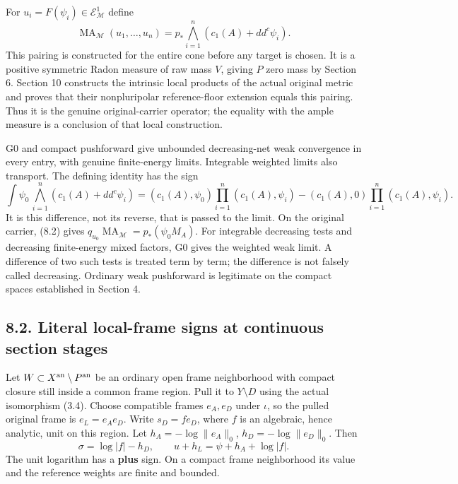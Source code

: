 \documentclass[
  10pt,
]{article}
\begin{document}
For \(u_i=F(\psi_i)\in\mathcal E^1_{\mathcal M}\) define
\[\operatorname{MA}_{\mathcal M}(u_1,\ldots,u_n)
=p_*\bigwedge_{i=1}^n(c_1(A)+dd^c\psi_i).                \tag{8.1}\]
This pairing is constructed for the entire cone before any target is
chosen. It is a positive symmetric Radon measure of raw mass \(V\),
giving \(P\) zero mass by Section 6. Section 10 constructs the intrinsic
local products of the actual original metric and proves that their
nonpluripolar reference-floor extension equals this pairing. Thus it is
the genuine original-carrier operator; the equality with the ample
measure is a conclusion of that local construction.

G0 and compact pushforward give unbounded decreasing-net weak
convergence in every entry, with genuine finite-energy limits.
Integrable weighted limits also transport. The defining identity has the
sign \[\int\psi_0\,\bigwedge_{i=1}^n(c_1(A)+dd^c\psi_i)
=(c_1(A),\psi_0)\prod_{i=1}^n(c_1(A),\psi_i)
-(c_1(A),0)\prod_{i=1}^n(c_1(A),\psi_i).                 \tag{8.2}\] It
is this difference, not its reverse, that is passed to the limit. On the
original carrier, (8.2) gives
\(q_{u_0}\operatorname{MA}_{\mathcal M}=p_*(\psi_0 M_A)\). For
integrable decreasing tests and decreasing finite-energy mixed factors,
G0 gives the weighted weak limit. A difference of two such tests is
treated term by term; the difference is not falsely called decreasing.
Ordinary weak pushforward is legitimate on the compact spaces
established in Section 4.

\subsection{8.2. Literal local-frame signs at continuous section
stages}\label{literal-local-frame-signs-at-continuous-section-stages}

Let \(W\subset X^{\rm an}\setminus P^{\rm an}\) be an ordinary open
frame neighborhood with compact closure still inside a common frame
region. Pull it to \(Y\setminus D\) using the actual isomorphism (3.4).
Choose compatible frames \(e_A,e_D\) under \(\iota\), so the pulled
original frame is \(e_L=e_Ae_D\). Write \(s_D=f e_D\), where \(f\) is an
algebraic, hence analytic, unit on this region. Let
\(h_A=-\log\|e_A\|_0\), \(h_D=-\log\|e_D\|_0\). Then
\[\sigma=\log|f|-h_D,\qquad
u+h_L=\psi+h_A+\log|f|.                                \tag{8.3}\] The
unit logarithm has a \textbf{plus} sign. On a compact frame neighborhood
its value and the reference weights are finite and bounded.
\end{document}
